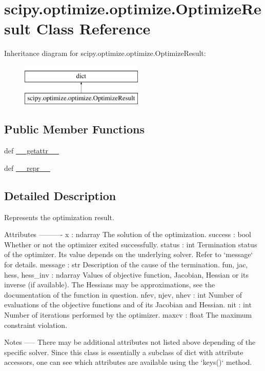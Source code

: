 \hypertarget{classscipy_1_1optimize_1_1optimize_1_1OptimizeResult}{}\section{scipy.\+optimize.\+optimize.\+Optimize\+Result Class Reference}
\label{classscipy_1_1optimize_1_1optimize_1_1OptimizeResult}
Inheritance diagram for scipy.\+optimize.\+optimize.\+Optimize\+Result\+:\begin{figure}[H]
\begin{center}
\leavevmode
\includegraphics[height=2.000000cm]{classscipy_1_1optimize_1_1optimize_1_1OptimizeResult}
\end{center}
\end{figure}
\subsection*{Public Member Functions}
\begin{DoxyCompactItemize}
\item 
def \hyperlink{classscipy_1_1optimize_1_1optimize_1_1OptimizeResult_a3f58f3a7784e3bbbdafb4ab18720f4ff}{\+\_\+\+\_\+getattr\+\_\+\+\_\+}
\item 
def \hyperlink{classscipy_1_1optimize_1_1optimize_1_1OptimizeResult_a0d9af8648fc9ccba3e1cdb01ad70a1a0}{\+\_\+\+\_\+repr\+\_\+\+\_\+}
\end{DoxyCompactItemize}


\subsection{Detailed Description}
\begin{DoxyVerb}Represents the optimization result.

Attributes
----------
x : ndarray
    The solution of the optimization.
success : bool
    Whether or not the optimizer exited successfully.
status : int
    Termination status of the optimizer. Its value depends on the
    underlying solver. Refer to `message` for details.
message : str
    Description of the cause of the termination.
fun, jac, hess, hess_inv : ndarray
    Values of objective function, Jacobian, Hessian or its inverse (if
    available). The Hessians may be approximations, see the documentation
    of the function in question.
nfev, njev, nhev : int
    Number of evaluations of the objective functions and of its
    Jacobian and Hessian.
nit : int
    Number of iterations performed by the optimizer.
maxcv : float
    The maximum constraint violation.

Notes
-----
There may be additional attributes not listed above depending of the
specific solver. Since this class is essentially a subclass of dict
with attribute accessors, one can see which attributes are available
using the `keys()` method.
\end{DoxyVerb}
 

